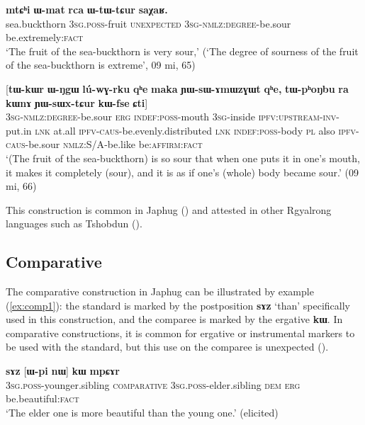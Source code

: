 \documentclass[oneside,a4paper,11pt]{article}
\newcommand{\ipa}[1]{{\phon\textbf{#1}}} %
\begin{document}
\begin{exe}
\ex \label{ex:WtWCur}
\gll 
\ipa{mtɕʰi}  	\ipa{ɯ-mat}  	\ipa{rca}  	\ipa{ɯ-tɯ-tɕur}  	\ipa{saχaʁ.}  	   \\
sea.buckthorn \textsc{3sg.poss}-fruit \textsc{unexpected} \textsc{3sg-nmlz:degree}-be.sour be.extremely:\textsc{fact}   \\
\glt `The fruit of the sea-buckthorn is very sour,' (`The degree of sourness of the fruit of the sea-buckthorn is extreme', 09 mi, 65)
\end{exe}

\begin{exe}
\ex \label{ex:YWsWxtCur}
\gll 
 	[\ipa{ɯ-tɯ-tɕur}]  	\ipa{\textbf{kɯ}}  	[\ipa{tɯ-kɯr}  	\ipa{ɯ-ŋgɯ}  	\ipa{lú-wɣ-rku}  	\ipa{qʰe}  	\ipa{maka}  	\ipa{ɲɯ-sɯ-ɤmɯzɣɯt}  	\ipa{qʰe,}  	\ipa{tɯ-pʰoŋbu}  	\ipa{ra}  	\ipa{kɯnɤ}  	\ipa{ɲɯ-sɯx-tɕur}  	\ipa{kɯ-fse}  	\ipa{ɕti}]  \\
  \textsc{3sg-nmlz:degree}-be.sour \textsc{erg} \textsc{indef:poss}-mouth \textsc{3sg}-inside \textsc{ipfv:upstream-inv}-put.in \textsc{lnk} at.all \textsc{ipfv-caus}-be.evenly.distributed \textsc{lnk} \textsc{indef:poss}-body \textsc{pl} also \textsc{ipfv-caus}-be.sour \textsc{nmlz:S/A}-be.like be:\textsc{affirm}:\textsc{fact} \\
\glt `(The fruit of the sea-buckthorn) is so sour that when one puts it in one's mouth, it makes it completely (sour), and it is as if one's (whole) body became sour.' (09 mi, 66)
\end{exe}

This construction is common in Japhug (\citealt[8]{jacques16comparative}) and attested in other Rgyalrong languages such as Tshobdun (\citealt[911]{jackson06guanxiju}).

\subsection{Comparative}
The comparative construction in Japhug can be illustrated by example (\ref{ex:comp1}): the  standard is marked by the postposition \ipa{sɤz} `than' specifically used in this construction, and the comparee is marked by the ergative  \ipa{kɯ}. In comparative constructions, it is common for ergative or instrumental markers to be used with the standard, but this use on the comparee is unexpected (\citealt{jacques16comparative}).

\begin{exe}
\ex \label{ex:comp1}
\gll  \ipa{ɯ-ʁi}   	\ipa{sɤz}   	[\ipa{ɯ-pi}   	\ipa{nɯ}]   	\ipa{\textbf{kɯ}}   	\ipa{mpɕɤr}     \\
\textsc{3sg.poss}-younger.sibling \textsc{comparative} \textsc{3sg.poss}-elder.sibling \textsc{dem} \textsc{erg}  be.beautiful:\textsc{fact} \\
\glt `The elder one is more beautiful than the young one.' (elicited)
\end{exe}
\end{document}
